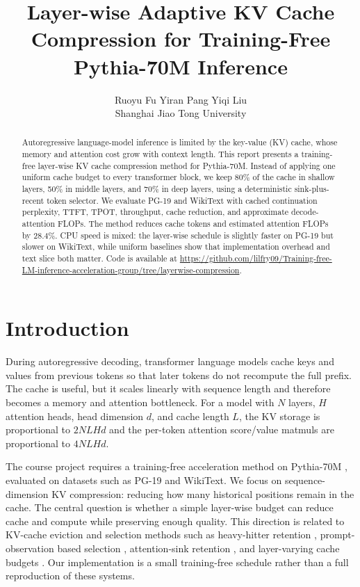 \documentclass{article}
\title{Layer-wise Adaptive KV Cache Compression for Training-Free Pythia-70M Inference}
\author{
  Ruoyu Fu \quad Yiran Pang \quad Yiqi Liu \\
  Shanghai Jiao Tong University \\
}
\begin{document}
\hypersetup{hidelinks}
\maketitle

\begin{abstract}
Autoregressive language-model inference is limited by the key-value (KV) cache,
whose memory and attention cost grow with context length.  This report presents
a training-free layer-wise KV cache compression method for Pythia-70M.  Instead
of applying one uniform cache budget to every transformer block, we keep 80\% of
the cache in shallow layers, 50\% in middle layers, and 70\% in deep layers,
using a deterministic sink-plus-recent token selector.  We evaluate PG-19 and
WikiText with cached continuation perplexity, TTFT, TPOT, throughput, cache
reduction, and approximate decode-attention FLOPs.  The method reduces cache
tokens and estimated attention FLOPs by 28.4\%.  CPU speed is mixed: the
layer-wise schedule is slightly faster on PG-19 but slower on WikiText, while
uniform baselines show that implementation overhead and text slice both matter.
Code is available at
\url{https://github.com/lilfry09/Training-free-LM-inference-acceleration-group/tree/layerwise-compression}.
\end{abstract}

\section{Introduction}

During autoregressive decoding, transformer language models cache keys and
values from previous tokens so that later tokens do not recompute the full
prefix.  The cache is useful, but it scales linearly with sequence length and
therefore becomes a memory and attention bottleneck.  For a model with $N$
layers, $H$ attention heads, head dimension $d$, and cache length $L$, the KV
storage is proportional to $2NLHd$ and the per-token attention score/value
matmuls are proportional to $4NLHd$.

The course project requires a training-free acceleration method on Pythia-70M
\citep{biderman2023pythia}, evaluated on datasets such as PG-19 and WikiText.
We focus on sequence-dimension KV compression: reducing how many historical
positions remain in the cache.  The central question is whether a simple
layer-wise budget can reduce cache and compute while preserving enough quality.
This direction is related to KV-cache eviction and selection methods such as
heavy-hitter retention \citep{zhang2023h2o}, prompt-observation based selection
\citep{li2024snapkv}, attention-sink retention \citep{xiao2024attention}, and
layer-varying cache budgets \citep{cai2024pyramidkv}.  Our implementation is a
small training-free schedule rather than a full reproduction of these systems.
\end{document}
